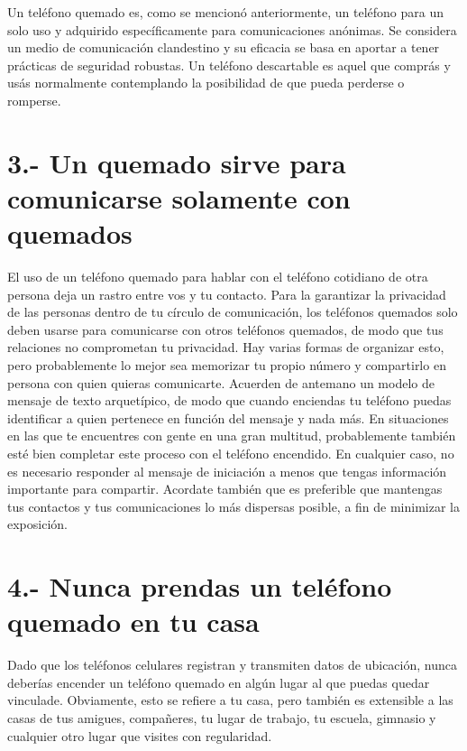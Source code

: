 \documentclass[
]{book}
\begin{document}
Un teléfono quemado es, como se mencionó anteriormente, un teléfono para un solo uso y adquirido específicamente para comunicaciones anónimas. Se considera un medio de comunicación clandestino y su eficacia se basa en aportar a tener prácticas de seguridad robustas. Un teléfono descartable es aquel que comprás y usás normalmente contemplando la posibilidad de que pueda perderse o romperse.

\hypertarget{un-quemado-sirve-para-comunicarse-solamente-con-quemados}{%
\chapter*{3.- Un quemado sirve para comunicarse solamente con quemados}\label{un-quemado-sirve-para-comunicarse-solamente-con-quemados}}

El uso de un teléfono quemado para hablar con el teléfono cotidiano de otra persona deja un rastro entre vos y tu contacto. Para la garantizar la privacidad de las personas dentro de tu círculo de comunicación, los teléfonos quemados solo deben usarse para comunicarse con otros teléfonos quemados, de modo que tus relaciones no comprometan tu privacidad. Hay varias formas de organizar esto, pero probablemente lo mejor sea memorizar tu propio número y compartirlo en persona con quien quieras comunicarte. Acuerden de antemano un modelo de mensaje de texto arquetípico, de modo que cuando enciendas tu teléfono puedas identificar a quien pertenece en función del mensaje y nada más. En situaciones en las que te encuentres con gente en una gran multitud, probablemente también esté bien completar este proceso con el teléfono encendido. En cualquier caso, no es necesario responder al mensaje de iniciación a menos que tengas información importante para compartir. Acordate también que es preferible que mantengas tus contactos y tus comunicaciones lo más dispersas posible, a fin de minimizar la exposición.

\hypertarget{nunca-prendas-un-teluxe9fono-quemado-en-tu-casa}{%
\chapter*{4.- Nunca prendas un teléfono quemado en tu casa}\label{nunca-prendas-un-teluxe9fono-quemado-en-tu-casa}}

Dado que los teléfonos celulares registran y transmiten datos de ubicación, nunca deberías encender un teléfono quemado en algún lugar al que puedas quedar vinculade. Obviamente, esto se refiere a tu casa, pero también es extensible a las casas de tus amigues, compañeres, tu lugar de trabajo, tu escuela, gimnasio y cualquier otro lugar que visites con regularidad.
\end{document}

